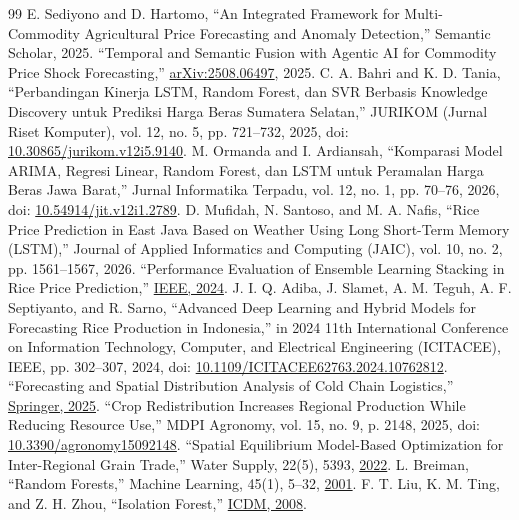 \documentclass[journal, a4paper]{IEEEtran}
\begin{document}
\begin{thebibliography}{99}
   E. Sediyono and D. Hartomo, ``An Integrated Framework for Multi-Commodity Agricultural Price Forecasting and Anomaly Detection,'' Semantic Scholar, 2025.
   ``Temporal and Semantic Fusion with Agentic AI for Commodity Price Shock Forecasting,'' \href{https://arxiv.org/abs/2508.06497}{arXiv:2508.06497}, 2025.
   C. A. Bahri and K. D. Tania, ``Perbandingan Kinerja LSTM, Random Forest, dan SVR Berbasis Knowledge Discovery untuk Prediksi Harga Beras Sumatera Selatan,'' JURIKOM (Jurnal Riset Komputer), vol. 12, no. 5, pp. 721--732, 2025, doi: \href{https://doi.org/10.30865/jurikom.v12i5.9140}{10.30865/jurikom.v12i5.9140}.
   M. Ormanda and I. Ardiansah, ``Komparasi Model ARIMA, Regresi Linear, Random Forest, dan LSTM untuk Peramalan Harga Beras Jawa Barat,'' Jurnal Informatika Terpadu, vol. 12, no. 1, pp. 70--76, 2026, doi: \href{https://doi.org/10.54914/jit.v12i1.2789}{10.54914/jit.v12i1.2789}.
   D. Mufidah, N. Santoso, and M. A. Nafis, ``Rice Price Prediction in East Java Based on Weather Using Long Short-Term Memory (LSTM),'' Journal of Applied Informatics and Computing (JAIC), vol. 10, no. 2, pp. 1561--1567, 2026.
   ``Performance Evaluation of Ensemble Learning Stacking in Rice Price Prediction,'' \href{https://doi.org/10.1109/10957374}{IEEE, 2024}.
   J. I. Q. Adiba, J. Slamet, A. M. Teguh, A. F. Septiyanto, and R. Sarno, ``Advanced Deep Learning and Hybrid Models for Forecasting Rice Production in Indonesia,'' in 2024 11th International Conference on Information Technology, Computer, and Electrical Engineering (ICITACEE), IEEE, pp. 302--307, 2024, doi: \href{https://doi.org/10.1109/ICITACEE62763.2024.10762812}{10.1109/ICITACEE62763.2024.10762812}.
   ``Forecasting and Spatial Distribution Analysis of Cold Chain Logistics,'' \href{https://doi.org/10.1007/s10668-025-06969-9}{Springer, 2025}.
   ``Crop Redistribution Increases Regional Production While Reducing Resource Use,'' MDPI Agronomy, vol. 15, no. 9, p. 2148, 2025, doi: \href{https://doi.org/10.3390/agronomy15092148}{10.3390/agronomy15092148}.
   ``Spatial Equilibrium Model-Based Optimization for Inter-Regional Grain Trade,'' Water Supply, 22(5), 5393, \href{https://iwaponline.com/ws/article/22/5/5393}{2022}.
   L. Breiman, ``Random Forests,'' Machine Learning, 45(1), 5--32, \href{https://doi.org/10.1023/A:1010933404324}{2001}.
   F. T. Liu, K. M. Ting, and Z. H. Zhou, ``Isolation Forest,'' \href{https://doi.org/10.1109/ICDM.2008.17}{ICDM, 2008}.

\end{thebibliography}
\end{document}
